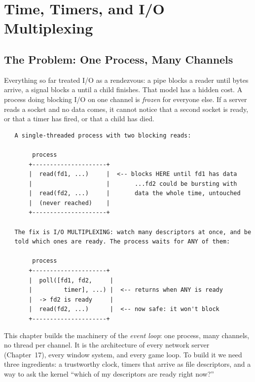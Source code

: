 
\chapter{Time, Timers, and I/O Multiplexing}

\section{The Problem: One Process, Many Channels}

Everything so far treated I/O as a rendezvous: a pipe blocks a reader
until bytes arrive, a signal blocks a  until a child
finishes. That model has a hidden cost. A process doing blocking I/O
on one channel is \emph{frozen} for everyone else. If a server reads a
socket and no data comes, it cannot notice that a second socket is
ready, or that a timer has fired, or that a child has died.

\begin{verbatim}
   A single-threaded process with two blocking reads:

        process
       +---------------------+
       |  read(fd1, ...)     |  <-- blocks HERE until fd1 has data
       |                     |       ...fd2 could be bursting with
       |  read(fd2, ...)     |       data the whole time, untouched
       |  (never reached)    |
       +---------------------+

   The fix is I/O MULTIPLEXING: watch many descriptors at once, and be
   told which ones are ready. The process waits for ANY of them:

        process
       +---------------------+
       |  poll([fd1, fd2,     |
       |         timer], ...) |  <-- returns when ANY is ready
       |  -> fd2 is ready     |
       |  read(fd2, ...)      |  <-- now safe: it won't block
       +---------------------+
\end{verbatim}

This chapter builds the machinery of the \emph{event loop}: one
process, many channels, no thread per channel. It is the architecture
of every network server (Chapter~17), every window system, and every
game loop. To build it we need three ingredients: a trustworthy clock,
timers that arrive as file descriptors, and a way to ask the kernel
``which of my descriptors are ready right now?''

